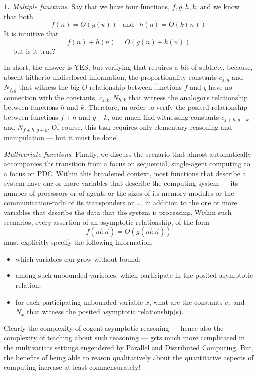\noindent
{\bf 1.}
{\em Multiple functions}.
%
Say that we have four functions, $f, g, h, k$, and we know that both
\[ f(n) = O(g(n)) \ \ \mbox{ and } \ \ h(n) = O(k(n)) \]
It is intuitive that
\[ f(n) + h(n) = O(g(n) + k(n)) \]
--- but is it true?

In short, the answer is YES, but verifying that requires a bit of
subtlety, because, absent hitherto undisclosed information, the
proportionality constants $c_{f,g}$ and $N_{f,g}$ that witness the
big-$O$ relationship between functions $f$ and $g$ have no connection
with the constants, $c_{h,k}, N_{h,k}$ that witness the analogous
relationship between functions $h$ and $k$.  Therefore, in order to
verify the posited relationship between functions $f + h$ and $g + k$,
one much find witnessing constants $c_{f+h, g+k}$ and $N_{f+h,g+k}$.
Of course, this task requires only elementary reasoning and
manipulation --- but it must be done!


{\em Multivariate functions}.
%
Finally, we discuss the scenario that almost automatically accompanies
the transition from a focus on sequential, single-agent computing to a
focus on PDC.  Within this broadened context, most functions that
describe a system have one or more variables that describe the
computing system --- its number of processors or of agents or the
sizes of its memory modules or the communication-radii of its
transponders or \ldots, in addition to the one or more variables that
describe the data that the system is processing.  Within such
scenarios, every assertion of an asymptotic relationship, of the form
\[ f(\vec{m}; \vec{n}) = O(g(\vec{m}; \vec{n})) \]
must explicitly specify the following information:
\begin{itemize}
\item
which variables can grow without bound;
\item
among such unbounded variables, which participate in the posited
asymptotic relation;
\item
for each participating unbounded variable $x$, what are the constants
$c_x$ and $N_x$ that witness the posited asymptotic relationship(s).
\end{itemize}

Clearly the complexity of cogent asymptotic reasoning --- hence also
the complexity of teaching about such reasoning --- gets much more
complicated in the multivariate settings engendered by Parallel and Distributed Computing.  
But, the benefits of being able to reason qualitatively about the quantitative
aspects of computing increase at least commensurately!

